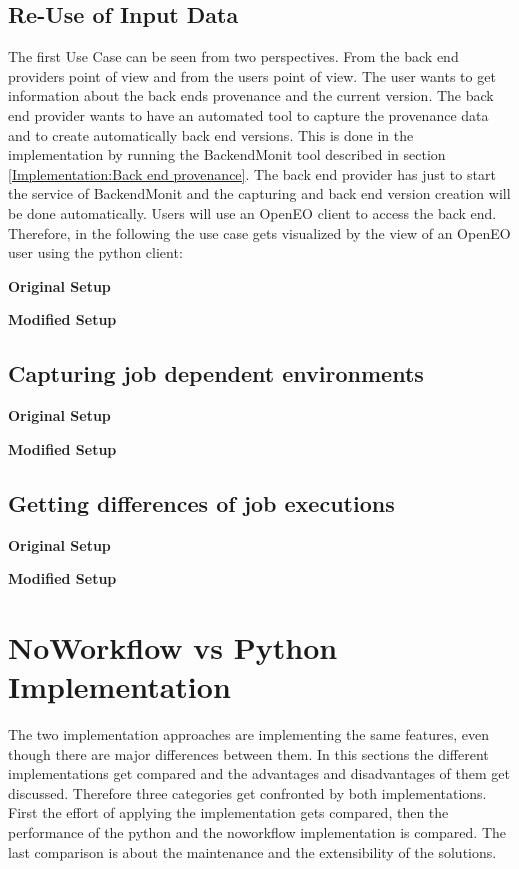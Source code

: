 \documentclass[draft,final]{vutinfth} %
\begin{document}
\subsection{Re-Use of Input Data}\label{Evaluation:Use Case1}
The first Use Case can be seen from two perspectives. From the back end providers point of view and from the users point of view. The user wants to get information about the back ends provenance and the current version. The back end provider wants to have an automated tool to capture the provenance data and to create automatically back end versions. This is done in the implementation by running the BackendMonit tool described in section \ref{Implementation:Back end provenance}. The back end provider has just to start the service of BackendMonit and the capturing and back end version creation will be done automatically. 
Users will use an OpenEO client to access the back end. Therefore, in the following the use case gets visualized by the view of an OpenEO user using the python client: 

\textbf{Original Setup}

\textbf{Modified Setup}



\subsection{Capturing job dependent environments}\label{Evaluation:Use Case2}

\textbf{Original Setup}

\textbf{Modified Setup}

\subsection{Getting differences of job executions}\label{Evaluation:Use Case3}

\textbf{Original Setup}

\textbf{Modified Setup}


\section{NoWorkflow vs Python Implementation}\label{Evaluation:NvsP}
The two implementation approaches are implementing the same features, even though there are major differences between them. In this sections the different implementations get compared and the advantages and disadvantages of them get discussed. Therefore three categories get confronted by both implementations. First the effort of applying the implementation gets compared, then the performance of the python and the noworkflow implementation is compared. The last comparison is about the maintenance and the extensibility of the solutions. 
\end{document}
